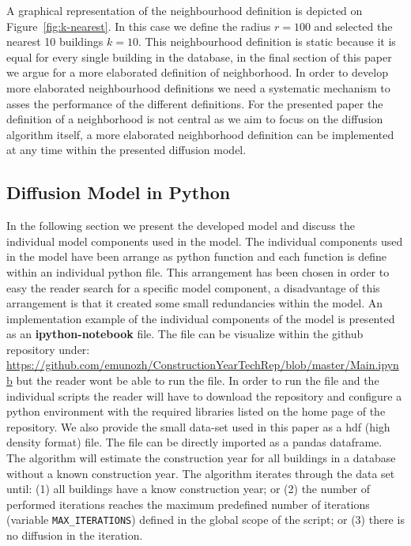 A graphical representation of the neighbourhood definition is depicted on
Figure~\ref{fig:k-nearest}. In this case we define the radius $r=100$ and
selected the nearest 10 buildings $k=10$. This neighbourhood definition is
static because it is equal for every single building in the database, in the
final section of this paper we argue for a more elaborated definition of
neighborhood. In order to develop more elaborated neighbourhood definitions we
need a systematic mechanism to asses the performance of the different
definitions. For the presented paper the definition of a neighborhood is not
central as we aim to focus on the diffusion algorithm itself, a more elaborated
neighborhood definition can be implemented at any time within the presented
diffusion model.\\

\subsection{Diffusion Model in Python}

In the following section we present the developed model and discuss the
individual model components used in the model. The individual components used
in the model have been arrange as python function and each function is define
within an individual python file. This arrangement has been chosen in order to
easy the reader search for a specific model component, a disadvantage of this
arrangement is that it created some small redundancies within the model. An
implementation example of the individual components of the model is presented
as an \textbf{ipython-notebook} file. The file can be visualize within the
github repository under:
\url{https://github.com/emunozh/ConstructionYearTechRep/blob/master/Main.ipynb}
but the reader wont be able to run the file. In order to run the file and the
individual scripts the reader will have to download the repository and
configure a python environment with the required libraries listed on the home
page of the repository. We also provide the small data-set used in this paper
as a hdf (high density format) file. The file can be directly imported as a
pandas dataframe.\\

The algorithm will estimate the construction year for all buildings in a
database without a known construction year. The algorithm iterates through the
data set until: (1) all buildings have a know construction year; or (2) the
number of performed iterations reaches the maximum predefined number of
iterations (variable \verb|MAX_ITERATIONS|) defined in the global scope of the
script; or (3) there is no diffusion in the iteration.\\

